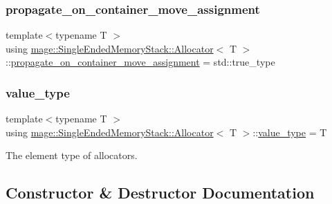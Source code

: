 \subsubsection{\texorpdfstring{propagate\+\_\+on\+\_\+container\+\_\+move\+\_\+assignment}{propagate\_on\_container\_move\_assignment}}
{\footnotesize\ttfamily template$<$typename T $>$ \\
using \mbox{\hyperlink{classmage_1_1_single_ended_memory_stack_1_1_allocator}{mage\+::\+Single\+Ended\+Memory\+Stack\+::\+Allocator}}$<$ T $>$\+::\mbox{\hyperlink{classmage_1_1_single_ended_memory_stack_1_1_allocator_a299eaeb1bc7cdc17f58deefb8e334f34}{propagate\+\_\+on\+\_\+container\+\_\+move\+\_\+assignment}} =  std\+::true\+\_\+type}

\mbox{\label{classmage_1_1_single_ended_memory_stack_1_1_allocator_a1dafabb56c4b51ad6bfc19769f48c8be}} 
\subsubsection{\texorpdfstring{value\+\_\+type}{value\_type}}
{\footnotesize\ttfamily template$<$typename T $>$ \\
using \mbox{\hyperlink{classmage_1_1_single_ended_memory_stack_1_1_allocator}{mage\+::\+Single\+Ended\+Memory\+Stack\+::\+Allocator}}$<$ T $>$\+::\mbox{\hyperlink{classmage_1_1_single_ended_memory_stack_1_1_allocator_a1dafabb56c4b51ad6bfc19769f48c8be}{value\+\_\+type}} =  T}

The element type of allocators. 

\subsection{Constructor \& Destructor Documentation}
\mbox{\label{classmage_1_1_single_ended_memory_stack_1_1_allocator_abcbc435ff81182693d19aef11e6b4983}} 
